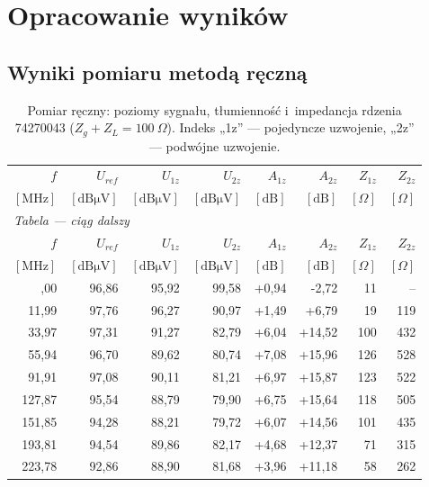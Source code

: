\documentclass[11pt,a4paper]{article}
\newcommand{\Zsum}{100\ \Omega}
\begin{document}
\section{Opracowanie wyników}

\subsection{Wyniki pomiaru metodą ręczną}

{\small
\begin{longtable}{rrrrrrrr}
  \caption{Pomiar ręczny: poziomy sygnału, tłumienność i~impedancja rdzenia 74270043
         ($Z_g+Z_L = \Zsum$). Indeks „1z” --- pojedyncze uzwojenie, „2z” --- podwójne uzwojenie.}
  \label{tab:reczny}\\
  \toprule
    $f$ & $U_{ref}$ & $U_{1z}$ & $U_{2z}$ & $A_{1z}$ & $A_{2z}$ & $Z_{1z}$ & $Z_{2z}$ \\
    $[\mathrm{MHz}]$ & $[\mathrm{dB\mu V}]$ & $[\mathrm{dB\mu V}]$ & $[\mathrm{dB\mu V}]$
    & $[\mathrm{dB}]$ & $[\mathrm{dB}]$ & $[\Omega]$ & $[\Omega]$ \\
  \midrule
\endfirsthead
  \multicolumn{8}{l}{\small\textit{Tabela \thetable{} --- ciąg dalszy}}\\
  \toprule
    $f$ & $U_{ref}$ & $U_{1z}$ & $U_{2z}$ & $A_{1z}$ & $A_{2z}$ & $Z_{1z}$ & $Z_{2z}$ \\
    $[\mathrm{MHz}]$ & $[\mathrm{dB\mu V}]$ & $[\mathrm{dB\mu V}]$ & $[\mathrm{dB\mu V}]$
    & $[\mathrm{dB}]$ & $[\mathrm{dB}]$ & $[\Omega]$ & $[\Omega]$ \\
  \midrule
\endhead
  \bottomrule
\endfoot
    2,00 & 96,86 & 95,92 & 99,58 & +0,94 & -2,72 & 11 & -- \\
    11,99 & 97,76 & 96,27 & 90,97 & +1,49 & +6,79 & 19 & 119 \\
    33,97 & 97,31 & 91,27 & 82,79 & +6,04 & +14,52 & 100 & 432 \\
    55,94 & 96,70 & 89,62 & 80,74 & +7,08 & +15,96 & 126 & 528 \\
    91,91 & 97,08 & 90,11 & 81,21 & +6,97 & +15,87 & 123 & 522 \\
    127,87 & 95,54 & 88,79 & 79,90 & +6,75 & +15,64 & 118 & 505 \\
    151,85 & 94,28 & 88,21 & 79,72 & +6,07 & +14,56 & 101 & 435 \\
    193,81 & 94,54 & 89,86 & 82,17 & +4,68 & +12,37 & 71 & 315 \\
    223,78 & 92,86 & 88,90 & 81,68 & +3,96 & +11,18 & 58 & 262 \\

\end{longtable}}
\end{document}
